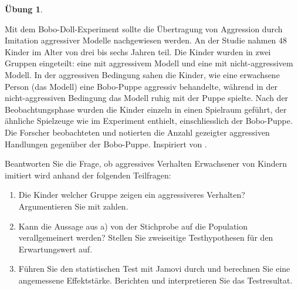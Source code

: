 \documentclass[
]{book}
\providecommand{\tightlist}{%
  \setlength{\itemsep}{0pt}\setlength{\parskip}{0pt}}
\theoremstyle{definition}
\theoremstyle{definition}
\theoremstyle{definition}
\newtheorem{exercise}{Übung}[chapter]
\theoremstyle{definition}
\theoremstyle{remark}
\begin{document}
\begin{exercise}
\protect\hypertarget{exr:bobo2groups}{}\label{exr:bobo2groups}\leavevmode

Mit dem Bobo-Doll-Experiment sollte die Übertragung von Aggression durch Imitation aggressiver Modelle nachgewiesen werden. An der Studie nahmen \(48\) Kinder im Alter von drei bis sechs Jahren teil. Die Kinder wurden in zwei Gruppen eingeteilt: eine mit aggressivem Modell und eine mit nicht-aggressivem Modell. In der aggressiven Bedingung sahen die Kinder, wie eine erwachsene Person (das Modell) eine Bobo-Puppe aggressiv behandelte, während in der nicht-aggressiven Bedingung das Modell ruhig mit der Puppe spielte. Nach der Beobachtungsphase wurden die Kinder einzeln in einen Spielraum geführt, der ähnliche Spielzeuge wie im Experiment enthielt, einschliesslich der Bobo-Puppe. Die Forscher beobachteten und notierten die Anzahl gezeigter aggressiven Handlungen gegenüber der Bobo-Puppe.
Inspiriert von \citet{bandura1961}.

Beantworten Sie die Frage, ob aggressives Verhalten Erwachsener von Kindern imitiert wird anhand der folgenden Teilfragen:

\begin{enumerate}
\def\labelenumi{\alph{enumi})}
\tightlist
\item
  Die Kinder welcher Gruppe zeigen ein aggressiveres Verhalten? Argumentieren Sie mit zahlen.
\item
  Kann die Aussage aus a) von der Stichprobe auf die Population verallgemeinert werden? Stellen Sie zweiseitige Testhypothesen für den Erwartungswert auf.
\item
  Führen Sie den statistischen Test mit Jamovi durch und berechnen Sie eine angemessene Effektstärke. Berichten und interpretieren Sie das Testresultat.
\end{enumerate}

\end{exercise}
\end{document}
